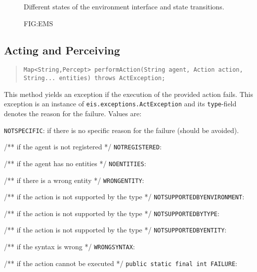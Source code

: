 \documentclass[a4]{article}
\begin{document}
\begin{figure}[h]\centering
{}
\caption{Different states of the environment interface and state transitions.}
\caption{FIG:EMS}
\end{figure}

\subsection{Acting and Perceiving}

\begin{quote}
\texttt{Map<String,Percept> performAction(String agent, Action action,
			String... entities) throws ActException;}
\end{quote}

This method yields an exception if the execution of the provided action fails. 
This exception is an instance of \texttt{eis.exceptions.ActException} and its 
\texttt{type}-field denotes the reason for the failure. Values are:
\begin{itemize}
\texttt{NOTSPECIFIC}: if there is no specific reason for the failure (should be avoided).
	
	/** if the agent is not registered */
\texttt{NOTREGISTERED}:
	
	/** if the agent has no entities */
\texttt{NOENTITIES}:
	
	/** if there is a wrong entity */
\texttt{WRONGENTITY}:
	
	/** if the action is not supported by the type */
\texttt{NOTSUPPORTEDBYENVIRONMENT}:

	/** if the action is not supported by the type */
\texttt{NOTSUPPORTEDBYTYPE}:

	/** if the action is not supported by the type */
\texttt{NOTSUPPORTEDBYENTITY}:
	
	/** if the syntax is wrong */
\texttt{WRONGSYNTAX}:
	
	/** if the action cannot be executed */
\texttt{public static final int FAILURE}:
\end{itemize}
\end{document}
